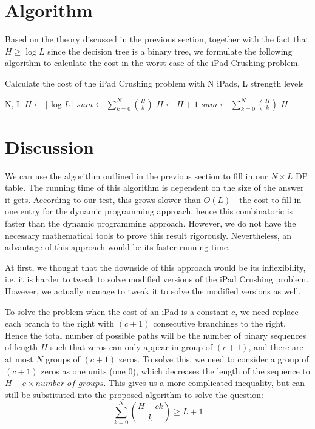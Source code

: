 \documentclass[12pt,a4paper,oneside]{report}
\begin{document}
\section{Algorithm}
Based on the theory discussed in the previous section, together with the fact that $H \geq \log L$ since the decision tree is a binary tree, we formulate the following algorithm to calculate the cost in the worst case of the iPad Crushing problem.

\begin{algorithm}
        \caption{Calculate the cost of the iPad Crushing problem with N iPads, L strength levels}
        \begin{algorithmic}[1]
            \REQUIRE N, L
	\STATE $H \leftarrow \lceil \log L\rceil$
	\STATE $sum \leftarrow \sum_{k=0}^{N} {H \choose k}$
		\STATE $H \leftarrow H+1$
		\STATE $sum \leftarrow \sum_{k=0}^{N} {H \choose k}$
	\ENDWHILE
	\RETURN $H$
        \end{algorithmic}
\end{algorithm}

\section{Discussion}
We can use the algorithm outlined in the previous section to fill in our $N \times L$ DP table. The running time of this algorithm is dependent on the size of the answer it gets. According to our test, this grows slower than $O(L)$ - the cost to fill in one entry for the dynamic programming approach, hence this combinatoric is faster than the dynamic programming approach. However, we do not have the necessary mathematical tools to prove this result rigorously. Nevertheless, an advantage of this approach would be its faster running time.

At first, we thought that the downside of this approach would be its inflexibility, i.e. it is harder to tweak to solve modified versions of the iPad Crushing problem. However, we actually manage to tweak it to solve the modified versions as well.

To solve the problem when the cost of an iPad is a constant $c$, we need replace each branch to the right with $(c+1)$ consecutive branchings to the right. Hence the total number of possible paths will be the number of binary sequences of length $H$ such that zeros can only appear in group of $(c+1)$, and there are at most $N$ groups of $(c+1)$ zeros. To solve this, we need to consider a group of $(c+1)$ zeros as one units (one 0), which decreases the length of the sequence to $H - c \times number\_of\_groups$. This gives us a more complicated inequality, but can still be substituted into the proposed algorithm to solve the question: \[\sum_{k=0}^{N} {H-ck \choose k} \geq L+1\]
\end{document}
